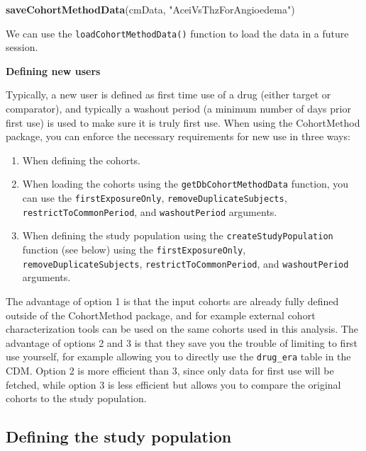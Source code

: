 \documentclass[]{book}
\newenvironment{Shaded}{\begin{snugshade}}{\end{snugshade}}
\newcommand{\KeywordTok}[1]{\textcolor[rgb]{0.13,0.29,0.53}{\textbf{#1}}}
\newcommand{\StringTok}[1]{\textcolor[rgb]{0.31,0.60,0.02}{#1}}
\newcommand{\NormalTok}[1]{#1}
\providecommand{\tightlist}{%
  \setlength{\itemsep}{0pt}\setlength{\parskip}{0pt}}
\begin{document}
\begin{Shaded}
\begin{Highlighting}[]
\KeywordTok{saveCohortMethodData}\NormalTok{(cmData, }\StringTok{"AceiVsThzForAngioedema"}\NormalTok{)}
\end{Highlighting}
\end{Shaded}

We can use the \texttt{loadCohortMethodData()} function to load the data
in a future session.

\textbf{Defining new users}

Typically, a new user is defined as first time use of a drug (either
target or comparator), and typically a washout period (a minimum number
of days prior first use) is used to make sure it is truly first use.
When using the CohortMethod package, you can enforce the necessary
requirements for new use in three ways:

\begin{enumerate}
\def\labelenumi{\arabic{enumi}.}
\tightlist
\item
  When defining the cohorts.
\item
  When loading the cohorts using the \texttt{getDbCohortMethodData}
  function, you can use the \texttt{firstExposureOnly},
  \texttt{removeDuplicateSubjects}, \texttt{restrictToCommonPeriod}, and
  \texttt{washoutPeriod} arguments.
\item
  When defining the study population using the
  \texttt{createStudyPopulation} function (see below) using the
  \texttt{firstExposureOnly}, \texttt{removeDuplicateSubjects},
  \texttt{restrictToCommonPeriod}, and \texttt{washoutPeriod} arguments.
\end{enumerate}

The advantage of option 1 is that the input cohorts are already fully
defined outside of the CohortMethod package, and for example external
cohort characterization tools can be used on the same cohorts used in
this analysis. The advantage of options 2 and 3 is that they save you
the trouble of limiting to first use yourself, for example allowing you
to directly use the \texttt{drug\_era} table in the CDM. Option 2 is
more efficient than 3, since only data for first use will be fetched,
while option 3 is less efficient but allows you to compare the original
cohorts to the study population.

\subsection{Defining the study
population}\label{defining-the-study-population}
\end{document}
